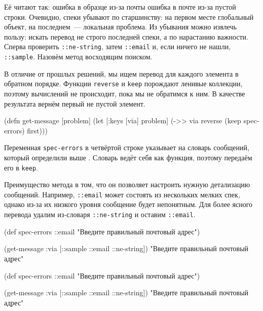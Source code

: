Её читают так: ошибка в образце из-за почты \arr{} ошибка в почте из-за
пустой строки. Очевидно, спеки убывают по старшинству: на первом месте
глобальный объект, на последнем~--- локальная проблема. Из убывания можно
извлечь пользу: искать перевод не строго последней спеки, а по нарастанию
важности. Сперва проверить \verb|::ne-string|, затем \verb|::email| и, если
ничего не нашли, \verb|::sample|. Назовём метод восходящим поиском.


В отличие от прошлых решений, мы ищем перевод для каждого элемента в обратном
порядке. Функции \verb|reverse| и \verb|keep| порождают ленивые коллекции,
поэтому вычислений не происходит, пока мы не обратимся к ним. В качестве
результата вернём первый не пустой элемент.

\begin{english}
  \begin{clojure/lines}
(defn get-message
  [problem]
  (let [{:keys [via]} problem]
    (->> via
         reverse
         (keep spec-errors)
         first)))
  \end{clojure/lines}
\end{english}

Переменная \verb|spec-errors| в четвёртой строке указывает на словарь сообщений,
который определили выше . Словарь ведёт себя как функция,
поэтому передаём его в \verb|keep|.

Преимущество метода в том, что он позволяет настроить нужную детализацию
сообщений. Например, \verb|::email| может состоять из нескольких мелких спек,
однако из-за их низкого уровня сообщение будет непонятным. Для более ясного
перевода удалим из-словаря \verb|::ne-string| и оставим \verb|::email|.

\ifx\DEVICETYPE\MOBILE

  \begin{clojure}
(def spec-errors
  {::email
   "Введите правильный почтовый адрес"})

(get-message
  {:via [::sample ::email ::ne-string]})
"Введите правильный почтовый адрес"
  \end{clojure}

\else

  \begin{clojure}
(def spec-errors
  {::email "Введите правильный почтовый адрес"})

(get-message {:via [::sample ::email ::ne-string]})
"Введите правильный почтовый адрес"
  \end{clojure}


